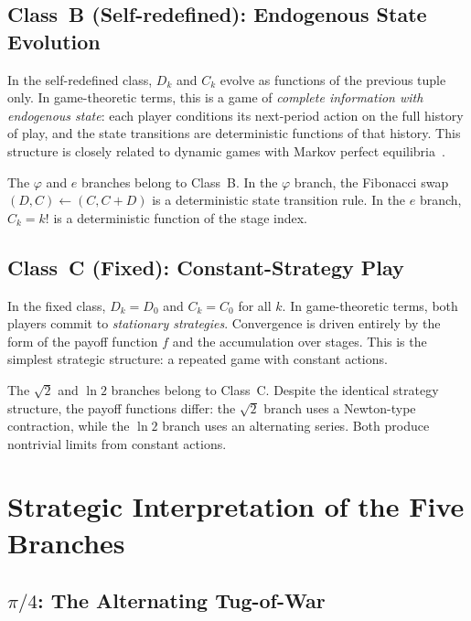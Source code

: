 \documentclass[12pt]{article}
\theoremstyle{definition}
\theoremstyle{remark}
\begin{document}
\subsection{Class~B (Self-redefined): Endogenous State Evolution}

In the self-redefined class, $D_k$ and $C_k$ evolve as functions of the previous tuple
only.  In game-theoretic terms, this is a game of \emph{complete information with
endogenous state}: each player conditions its next-period action on the full history of
play, and the state transitions are deterministic functions of that history.  This
structure is closely related to dynamic games with Markov perfect equilibria~\cite{MS94}.

The $\varphi$ and $e$ branches belong to Class~B.  In the $\varphi$ branch, the
Fibonacci swap $(D, C) \leftarrow (C, C+D)$ is a deterministic state transition rule.
In the $e$ branch, $C_k = k!$ is a deterministic function of the stage index.

\subsection{Class~C (Fixed): Constant-Strategy Play}

In the fixed class, $D_k = D_0$ and $C_k = C_0$ for all $k$.  In game-theoretic terms,
both players commit to \emph{stationary strategies}.  Convergence is driven entirely by
the form of the payoff function $f$ and the accumulation over stages.  This is the
simplest strategic structure: a repeated game with constant actions.

The $\sqrt{2}$ and $\ln 2$ branches belong to Class~C.  Despite the identical strategy
structure, the payoff functions differ: the $\sqrt{2}$ branch uses a Newton-type
contraction, while the $\ln 2$ branch uses an alternating series.  Both produce
nontrivial limits from constant actions.

\section{Strategic Interpretation of the Five Branches}
\label{sec:branches}

\subsection{\texorpdfstring{$\pi/4$}{pi/4}: The Alternating Tug-of-War}
\end{document}
